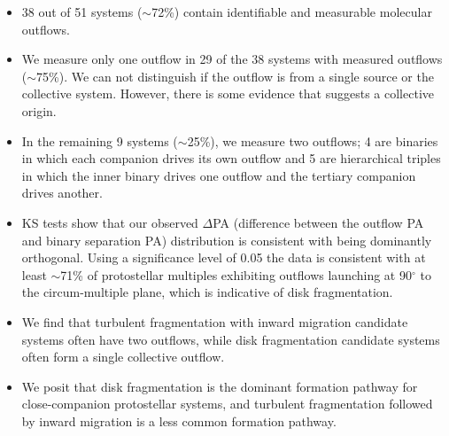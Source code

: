 \documentclass[linenumbers,twocolumn, twocolappendix]{aastex631}
\begin{document}
\begin{itemize}
    \item 38 out of 51 systems ($\sim$72\%) contain identifiable and measurable molecular outflows.
    \item We measure only one outflow in 29 of the 38 systems with measured outflows ($\sim$75\%). We can not distinguish if the outflow is from a single source or the collective system. However, there is some evidence that suggests a collective origin. 
    \item In the remaining 9 systems ($\sim$25\%), we measure two outflows; 4 are binaries in which each companion drives its own outflow and 5 are hierarchical triples in which the inner binary drives one outflow and the tertiary companion drives another.
    \item KS tests show that our observed $\Delta$PA (difference between the outflow PA and binary separation PA) distribution is consistent with being dominantly orthogonal. Using a significance level of 0.05 the data is consistent with at least $\sim$71\% of protostellar multiples exhibiting outflows launching at 90$^\circ$ to the circum-multiple plane, which is indicative of disk fragmentation.
    \item We find that turbulent fragmentation with inward migration candidate systems often have two outflows, while disk fragmentation candidate systems often form a single collective outflow.
    \item We posit that disk fragmentation is the dominant formation pathway for close-companion protostellar systems, and turbulent fragmentation followed by inward migration is a less common formation pathway.
\end{itemize}
\end{document}
